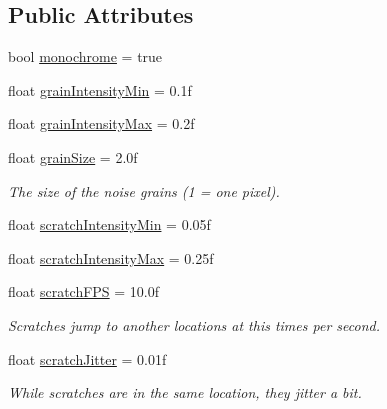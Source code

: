 \subsection*{Public Attributes}
\begin{DoxyCompactItemize}
\item 
bool \mbox{\hyperlink{class_unity_standard_assets_1_1_image_effects_1_1_noise_and_scratches_a515c34ae0514bdfe1e371ea784e6b060}{monochrome}} = true
\item 
float \mbox{\hyperlink{class_unity_standard_assets_1_1_image_effects_1_1_noise_and_scratches_a1016df7951938cbd8965a9c11ec5c3f0}{grain\+Intensity\+Min}} = 0.\+1f
\item 
float \mbox{\hyperlink{class_unity_standard_assets_1_1_image_effects_1_1_noise_and_scratches_a3473318ff609842ded2e4e35df09fc97}{grain\+Intensity\+Max}} = 0.\+2f
\item 
float \mbox{\hyperlink{class_unity_standard_assets_1_1_image_effects_1_1_noise_and_scratches_a98dcca804b05a811dadb1c8b574a9b5d}{grain\+Size}} = 2.\+0f
\begin{DoxyCompactList}\small\item\em The size of the noise grains (1 = one pixel). \end{DoxyCompactList}\item 
float \mbox{\hyperlink{class_unity_standard_assets_1_1_image_effects_1_1_noise_and_scratches_a79dfe5dd276e1003dc0a290bef8fb64d}{scratch\+Intensity\+Min}} = 0.\+05f
\item 
float \mbox{\hyperlink{class_unity_standard_assets_1_1_image_effects_1_1_noise_and_scratches_a2e7295f0098dd9e50ae06e845e0d4c7b}{scratch\+Intensity\+Max}} = 0.\+25f
\item 
float \mbox{\hyperlink{class_unity_standard_assets_1_1_image_effects_1_1_noise_and_scratches_adc6ca950f3b109218c60155ae6008c8e}{scratch\+F\+PS}} = 10.\+0f
\begin{DoxyCompactList}\small\item\em Scratches jump to another locations at this times per second. \end{DoxyCompactList}\item 
float \mbox{\hyperlink{class_unity_standard_assets_1_1_image_effects_1_1_noise_and_scratches_a8a6b0164386e3ea4c1efce764f7f8856}{scratch\+Jitter}} = 0.\+01f
\begin{DoxyCompactList}\small\item\em While scratches are in the same location, they jitter a bit. \end{DoxyCompactList}\item 

\end{DoxyCompactItemize}
